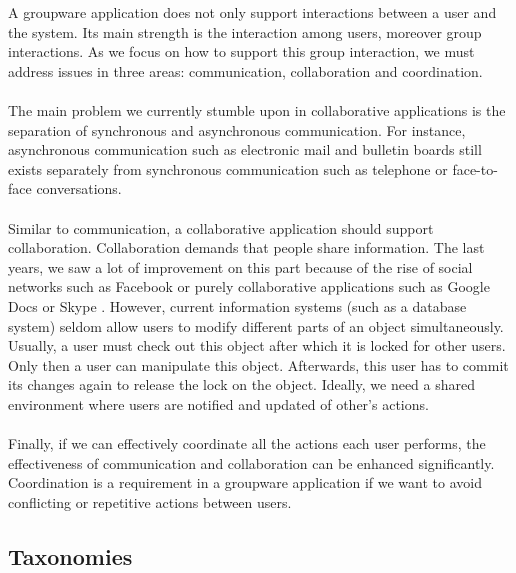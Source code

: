 A groupware application does not only support interactions between a user and the system. Its main strength is the interaction among users, moreover group interactions. As we focus on how to support this group interaction, we must address issues in three areas: communication, collaboration and coordination.
\\ \\
The main problem we currently stumble upon in collaborative applications is the separation of synchronous and asynchronous communication. For instance, asynchronous communication such as electronic mail and bulletin boards still exists separately from synchronous communication such as telephone or face-to-face conversations. 
\\ \\
Similar to communication, a collaborative application should support collaboration. Collaboration demands that people share information. The last years, we saw a lot of improvement on this part because of the rise of social networks such as Facebook \cite{Facebook} or purely collaborative applications such as Google Docs \cite{googleDocs} or Skype \cite{Skype}. However, current information systems (such as a database system) seldom allow users to modify different parts of an object simultaneously. Usually, a user must check out this object after which it is locked for other users. Only then a user can manipulate this object. Afterwards, this user has to commit its changes again to release the lock on the object. Ideally, we need a shared environment where users are notified and updated of other's actions. 
\\ \\
Finally, if we can effectively coordinate all the actions each user performs, the effectiveness of communication and collaboration can be enhanced significantly. Coordination is a requirement in a groupware application if we want to avoid conflicting or repetitive actions between users.

\subsection{Taxonomies}

